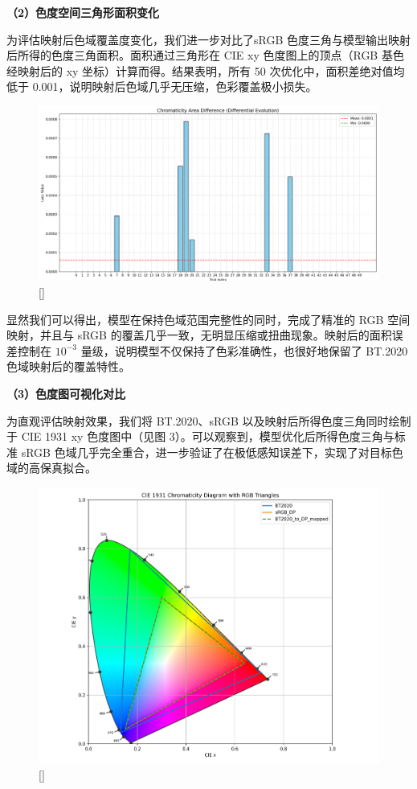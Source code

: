 \noindent\textbf{（2）色度空间三角形面积变化}

为评估映射后色域覆盖度变化，我们进一步对比了sRGB 色度三角与模型输出映射后所得的色度三角面积。面积通过三角形在 CIE xy 色度图上的顶点（RGB 基色经映射后的 xy 坐标）计算而得。结果表明，所有 50 次优化中，面积差绝对值均低于 0.001，说明映射后色域几乎无压缩，色彩覆盖极小损失。
\begin{figure}[htbp]
\centering
{}
\includegraphics[width=0.8\columnwidth]{figures/面积Loss.png}
\bicaption[50次独立优化实验面积差图]{}[]{}
\vspace{-10pt}
\label{figure3: 面积diff}
\end{figure}
显然我们可以得出，模型在保持色域范围完整性的同时，完成了精准的 RGB 空间映射，并且与 sRGB 的覆盖几乎一致，无明显压缩或扭曲现象。映射后的面积误差控制在 $10^{-3}$ 量级，说明模型不仅保持了色彩准确性，也很好地保留了 BT.2020 色域映射后的覆盖特性。

\noindent\textbf{（3）色度图可视化对比}

为直观评估映射效果，我们将 BT.2020、sRGB 以及映射后所得色度三角同时绘制于 CIE 1931 xy 色度图中（见图 3）。可以观察到，模型优化后所得色度三角与标准 sRGB 色域几乎完全重合，进一步验证了在极低感知误差下，实现了对目标色域的高保真拟合。
\begin{figure}[h]
\centering
{}
\includegraphics[width=0.8\columnwidth]{figures/色度.png}
\bicaption[色度图]{}[]{}
\vspace{-10pt}
\label{figure3: 色度图}
\end{figure}



